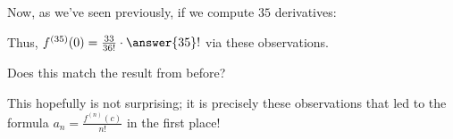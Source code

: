 \documentclass{ximera}
\begin{document}
\begin{exercise}
\begin{exercise}
\begin{exercise}
\begin{exercise}
\begin{exercise}
Now, as we've seen previously, if we compute $35$ derivatives:

\begin{image}
  \end{image}
  
Thus, $f^{(35)}(0) = \frac{33}{36!} \cdot \answer{35}!$ via these observations.  

Does this match the result from before?

\begin{multipleChoice}
\end{multipleChoice}  
 
 This hopefully is not surprising; it is precisely these observations that led to the formula $a_n = \frac{f^{(n)}(c)}{n!}$ in the first place!  

\end{exercise}
\end{exercise}
\end{exercise}
\end{exercise}



\end{exercise}
\end{document}
